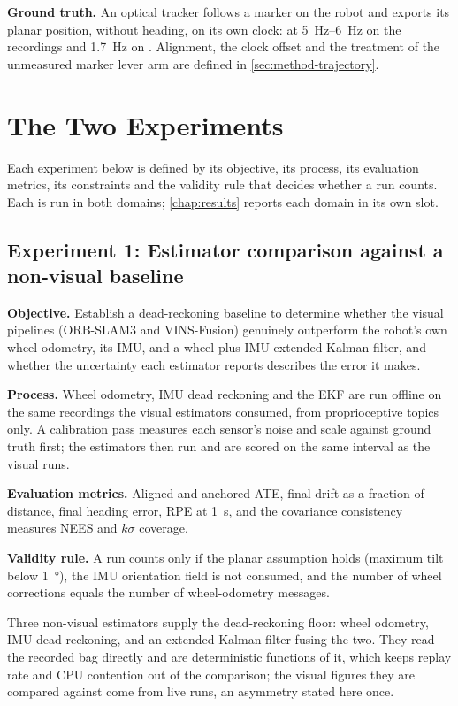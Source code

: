 \textbf{Ground truth.} An optical tracker follows a marker on the robot and
exports its planar position, without heading, on its own clock: at
\SIrange{5}{6}{\hertz} on the  recordings and \SI{1.7}{\hertz} on
. Alignment, the clock offset and the treatment of the
unmeasured marker lever arm are defined in \cref{sec:method-trajectory}.

\section{The Two Experiments}
\label{sec:experiments}

Each experiment below is defined by its objective, its process, its evaluation
metrics, its constraints and the validity rule that decides whether a run
counts. Each is run in both domains; \cref{chap:results} reports each domain in
its own slot.

\subsection{Experiment 1: Estimator comparison against a non-visual baseline}
\label{sec:proprio-method}

\textbf{Objective.} Establish a dead-reckoning baseline to determine whether the
visual pipelines (ORB-SLAM3 and VINS-Fusion) genuinely outperform the robot's
own wheel odometry, its IMU, and a wheel-plus-IMU extended Kalman filter, and
whether the uncertainty each estimator reports describes the error it makes.

\textbf{Process.} Wheel odometry, IMU dead reckoning and the EKF are run
offline on the same recordings the visual estimators consumed, from
proprioceptive topics only. A calibration pass measures each sensor's noise and
scale against ground truth first; the estimators then run and are scored on the
same interval as the visual runs.

\textbf{Evaluation metrics.} Aligned and anchored ATE, final drift as a fraction
of distance, final heading error, RPE at \SI{1}{\second}, and the covariance
consistency measures NEES and $k\sigma$ coverage.

\textbf{Validity rule.} A run counts only if the planar assumption holds
(maximum tilt below \SI{1}{\degree}), the IMU orientation field is not consumed,
and the number of wheel corrections equals the number of wheel-odometry
messages.

Three non-visual estimators supply the dead-reckoning floor: wheel odometry, IMU
dead reckoning, and an extended Kalman filter fusing the two. They read the
recorded bag directly and are deterministic functions of it, which keeps replay
rate and CPU contention out of the comparison; the visual figures they are
compared against come from live runs, an asymmetry stated here once.

